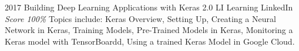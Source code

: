 \documentclass[11pt,a4paper]{moderncv}
\begin{document}
\cventry                                                          %
    {2017}                                                          %
    {Building Deep Learning Applications with Keras 2.0}                                                          %
    {LI Learning}                                                          %
    {LinkedIn}                                                          %
    {\textit{Score 100\%}}                                                          %
    {                                                          %
        Topics include:                                                          %
            Keras Overview,                                                      %
            Setting Up,                                                          %
            Creating a Neural Network in Keras,                                  %
            Training Models,                                                     %
            Pre-Trained Models in Keras,                                         %
            Monitoring a Keras model with TensorBoardd,                          %
            Using a trained Keras Model in Google Cloud.                         %
    }                                                          %
\end{document}
